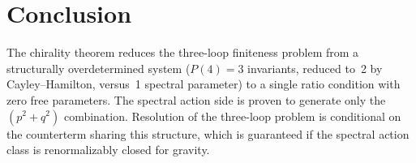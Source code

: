 \documentclass[12pt,a4paper]{article}
\begin{document}
\section{Conclusion}

The chirality theorem reduces the three-loop finiteness problem from a
structurally overdetermined system ($P(4) = 3$ invariants, reduced to~2 by
Cayley--Hamilton, versus~1 spectral parameter) to a single ratio condition
with zero free parameters.  The spectral action side is proven to generate
only the $(p^2 + q^2)$ combination.  Resolution of the three-loop problem
is conditional on the counterterm sharing this structure, which is guaranteed
if the spectral action class is renormalizably closed for gravity.
\end{document}
